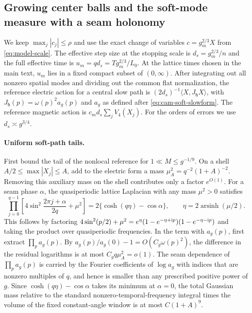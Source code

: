 \documentclass[11pt,a4paper]{article}
\numberwithin{equation}{section}
\newcommand{\hper}{\mathfrak h}
\begin{document}
\subsection{Growing center balls and the soft-mode measure with a seam holonomy}

We keep \(\max_j|c_j|\le \rho\) and use the exact change of variables \(c=g_m^{2/3}X\) from \eqref{eq:model-scale}. The effective step size at the stopping scale is \(d_s=g_m^{2/3}/n\) and the full effective time is \(u_m=q d_s=Tg_m^{2/3}/L_0\). At the lattice times chosen in the main text, \(u_m\) lies in a fixed compact subset of \((0,\infty)\). After integrating out all nonzero spatial modes and dividing out the common flat normalization, the reference electric action for a central slow path is
\((2d_s)^{-1}\langle X,J_\hper X\rangle\), with \(J_\hper (p)=\omega(p)^2a_g(p)\) and \(a_g\) as defined after \eqref{eq:cam-soft-slowform}. The reference magnetic action is \(c_m d_s\sum_j V_4(X_j)\). For the orders of errors we use \(d_s\asymp g^{3/4}\).

\paragraph{Uniform soft-path tails.}
First bound the tail of the nonlocal reference for \(1\ll M\le g^{-1/9}\). On a shell \(A/2\le\max |X_j|\le A\), add to the electric form
a mass \(\mu_A^2=q^{-2}(1+A)^{-2}\). Removing this auxiliary mass on the shell contributes only a factor \(e^{O(1)}\). For a seam phase \(\alpha\), the quasiperiodic lattice Laplacian with any mass \(\mu^2>0\) satisfies
\begin{equation}
 \prod_{j=0}^{q-1}\!
   \left[4\sin^2\!\frac{2\pi j+\alpha}{2q}+\mu^2\right]
   =2\{\cosh(q\eta)-\cos\alpha\},
 \qquad \eta=2\operatorname{arsinh}(\mu/2).                     \label{eq:cam-soft-twist}
\end{equation}
This follows by factoring \(4\sin^2(p/2)+\mu^2=e^\eta(1-e^{-\eta+{\rm i}p})(1-e^{-\eta-{\rm i}p})\) and taking the product over quasiperiodic frequencies. In the term with \(a_g(p)\), first extract \(\prod_p a_g(p)\). By \(a_g(p)/a_g(0)-1=O(C_g\omega(p)^2)\), the difference in the residual logarithms is at most \(C_g q \mu_A^2=o(1)\). The seam dependence of \(\prod_p a_g(p)\) is carried by the Fourier coefficients of \(\log a_g\) with indices that are nonzero multiples of \(q\), and hence is smaller than any prescribed positive power of \(g\). Since \(\cosh(q\eta)-\cos\alpha\) takes its minimum at \(\alpha=0\), the total Gaussian mass relative to the standard nonzero-temporal-frequency integral times the volume of the fixed constant-angle window is at most \(C(1+A)^9\).
\end{document}
